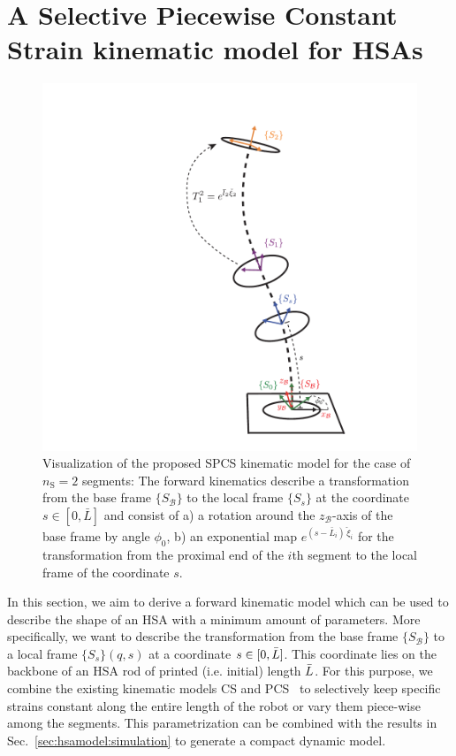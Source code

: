 \section{A Selective Piecewise Constant Strain kinematic model for HSAs}\label{sec:hsamodel:kinematic_model}
\begin{figure}[htb]
    \centering
    \includegraphics[width=0.25\columnwidth]{hsamodel/figures/kinematics/twisting_kinematics_v2_cropped.pdf}
    \caption{Visualization of the proposed \gls{SPCS} kinematic model for the case of $n_\mathrm{S} = 2$ segments: The forward kinematics describe a transformation from the base frame $\{ S_{\mathcal{B}} \}$ to the local frame $\{ S_s \}$ at the coordinate $s \in [0, \bar{L}]$ and consist of a) a rotation around the $z_{\mathcal{B}}$-axis of the base frame by angle $\phi_0$, b) an exponential map $e^{(s-\bar{L}_i) \, \check{\xi}_i}$ for the transformation from the proximal end of the $i$th segment to the local frame of the coordinate $s$. %
    }
    \label{fig:hsamodel:hsa_kinematics}
\end{figure}

In this section, we aim to derive a forward kinematic model which can be used to describe the shape of an \gls{HSA} with a minimum amount of parameters. More specifically, we want to describe the transformation from the base frame $\{ S_{\mathcal{B}} \}$ to a local frame $\{ S_s \}(q,s)$ at a coordinate $s \in [0, \Bar{L}]$. This coordinate lies on the backbone of an \gls{HSA} rod of printed (i.e. initial) length $\Bar{L}$.
For this purpose, we combine the existing kinematic models \gls{CS} and \gls{PCS}~\cite{renda2018discrete} to selectively keep specific strains constant along the entire length of the robot or vary them piece-wise among the segments.
This parametrization can be combined with the results in Sec.~\ref{sec:hsamodel:simulation} to generate a compact dynamic model.

